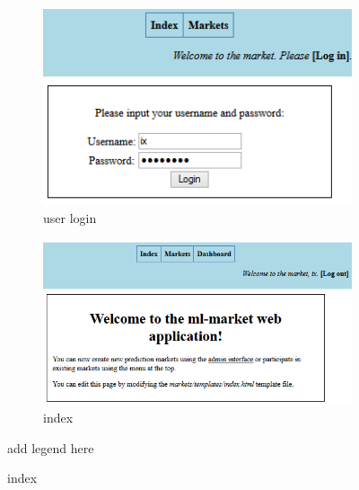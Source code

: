 \documentclass[bsc,frontabs,twoside,singlespacing,parskip,deptreport]{infthesis}     %
\begin{document}
\begin{figure}
\caption{User login and index}
\begin{subfigure}{.5\textwidth}

  \includegraphics[width=.95\linewidth]{figures/ui-user-login(c).png}
  \caption{user login}
  \label{fig:ui-user-login}
\end{subfigure}%
\begin{subfigure}{.6\textwidth}

  \includegraphics[width=1\linewidth]{figures/ui-index(1).png}
  \caption{index}
  \label{fig:ui-index}
\end{subfigure}
\label{fig:ui-login-index}
{add legend here}
\end{figure}
\end{document}
